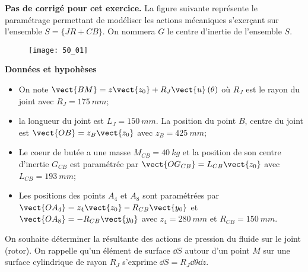\normaltrue \difficilefalse \tdifficilefalse
\correctionfalse


\setcounter{numques}{0}
\ifcorrection
\else
\textbf{Pas de corrigé pour cet exercice.}
\fi
\ifprof
\else
La figure suivante représente le paramétrage permettant de modéliser les actions mécaniques
s’exerçant sur l’ensemble $S=\{JR+CB\}$. On nommera $G$ le centre d’inertie de l’ensemble
$S$.


\begin{figure}[H]
\centering
\texttt{[image: 50\_01]}
\end{figure}
\fi

\textbf{Données et hypohèses}

\begin{itemize}
\item On note $\vect{BM}=z\vect{z_0}+R_J\vect{u}\left(\theta\right)$ où $R_J$ est le rayon du joint avec $R_J = \SI{175}{mm}$;
\item la longueur du joint est $L_J = \SI{150}{mm}$. La position du point $B$, centre du joint est $\vect{OB}=z_B\vect{z_0}$ avec $z_B = \SI{425}{mm}$;
\item Le coeur de butée a une masse $M_{CB} = \SI{40}{kg}$ et la position de son centre d’inertie $G_{CB}$ est paramétrée par $\vect{OG_{CB}}= L_{CB}\vect{z_0}$ avec $L_{CB} = \SI{193}{mm}$;
\item Les positions des points $A_4$ et $A_8$ sont paramétrées par $\vect{OA_4} = z_4\vect{z_0}-R_{CB}\vect{y_0}$ et
$\vect{OA_8}=-R_{CB}\vect{y_0}$ avec $z_4 = \SI{280}{mm}$ et $R_{CB}=\SI{150}{mm}$.
\end{itemize}


On souhaite déterminer la résultante des actions de pression du fluide sur le joint (rotor).
On rappelle qu’un élément de surface $\dd S$ autour d’un point $M$ sur une surface cylindrique
de rayon $R_J$ s’exprime $\dd S = R_J \dd \theta \dd z$.

